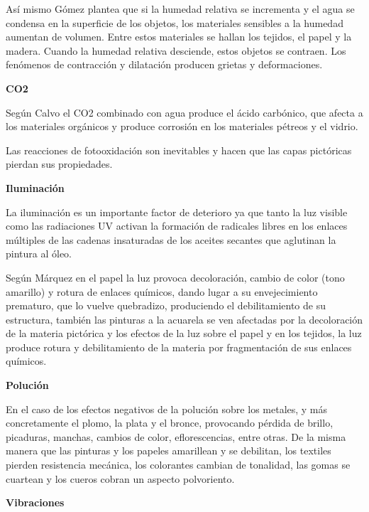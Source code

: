     Así mismo Gómez \cite{gomezcarreteroEfectosAcidoNitrico2015a} plantea que si la humedad relativa se incrementa y el agua se condensa en la superficie de los objetos, los materiales sensibles a la humedad aumentan de volumen. Entre estos materiales se hallan los tejidos, el papel y la madera. Cuando la humedad relativa desciende, estos objetos se contraen. Los fenómenos de contracción y dilatación producen grietas y deformaciones.

    \textbf{CO2}

    Según Calvo \cite{calvomanuelConservacionRestauracionPintura2002} el CO2 combinado con agua produce el ácido carbónico, que afecta a los materiales orgánicos y produce corrosión en los materiales pétreos y el vidrio.

    Las reacciones de fotooxidación son inevitables y hacen que las capas pictóricas pierdan sus propiedades.\cite{gomezcarreteroEfectosAcidoNitrico2015a}

    \textbf{Iluminación}

    La iluminación es un importante factor de deterioro ya que tanto la luz visible como las radiaciones UV activan la formación de radicales libres en los enlaces múltiples de las cadenas insaturadas de los aceites secantes que aglutinan la pintura al óleo.\cite{gomezcarreteroEfectosAcidoNitrico2015a}

    Según Márquez \cite{marquezAgentesDeterioroMedioambientales2016} en el papel la luz provoca decoloración, cambio de color (tono amarillo) y rotura de enlaces químicos, dando lugar a su envejecimiento prematuro, que lo vuelve quebradizo, produciendo el debilitamiento de su estructura, también las pinturas a la acuarela se ven afectadas por la decoloración de la materia pictórica y los efectos de la luz sobre el papel y en los tejidos, la luz produce rotura y debilitamiento de la materia por fragmentación de sus enlaces químicos.

    \textbf{Polución}

    En el caso de los efectos negativos de la polución sobre los metales, y más concretamente el plomo, la plata y el bronce, provocando pérdida de brillo, picaduras, manchas, cambios de color, eflorescencias, entre otras.
    De la misma manera que las pinturas y los papeles amarillean y se debilitan, los textiles pierden resistencia mecánica, los colorantes cambian de tonalidad, las gomas se cuartean y los cueros cobran un aspecto polvoriento.\cite{tapolComoAfrontarPolucion2001}

    \textbf{Vibraciones}

